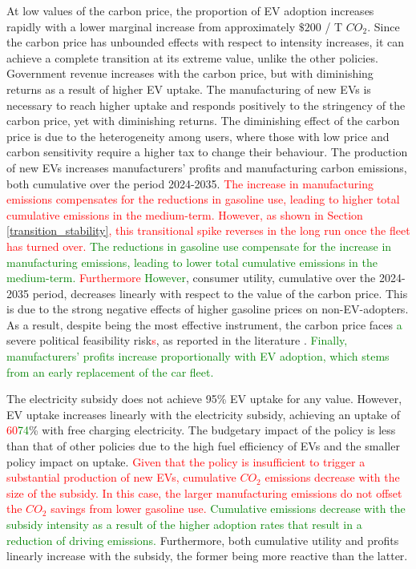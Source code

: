 \documentclass[12pt]{article}
\begin{document}
	At low values of the carbon price, the proportion of EV adoption increases rapidly with a lower marginal increase from approximately $\$200$ / T $CO_2$. Since the carbon price has unbounded effects with respect to intensity increases, it can achieve a complete transition at its extreme value, unlike the other policies. Government revenue increases with the carbon price, but with diminishing returns as a result of higher EV uptake. The manufacturing of new EVs is necessary to reach higher uptake and responds positively to the stringency of the carbon price, yet with diminishing returns. The diminishing effect of the carbon price is due to the heterogeneity among users, where those with low price and carbon sensitivity require a higher tax to change their behaviour. The production of new EVs increases manufacturers' profits and manufacturing carbon emissions, both cumulative over the period 2024-2035. \textcolor{red}{The increase in manufacturing emissions compensates for the reductions in gasoline use, leading to higher total cumulative emissions in the medium-term. However, as shown in Section \ref{transition_stability}, this transitional spike reverses in the long run once the fleet has turned over.} \textcolor{green}{The reductions in gasoline use compensate for the increase in manufacturing emissions, leading to lower total cumulative emissions in the medium-term.} \textcolor{red}{Furthermore} \textcolor{green}{However}, consumer utility, cumulative over the 2024-2035 period, decreases linearly with respect to the value of the carbon price. This is due to the strong negative effects of higher gasoline prices on non-EV-adopters. As a result, despite being the most effective instrument, the carbon price faces \textcolor{green}{a} severe political feasibility risk\textcolor{red}{s}, as reported in the literature \citep{maestre-andres_perceived_2019,savin2024carbon,mayol_analysis_2025}. \textcolor{green}{Finally, manufacturers' profits increase proportionally with EV adoption, which stems from an early replacement of the car fleet.}
	
	The electricity subsidy does not achieve 95\% EV uptake for any value. However, EV uptake increases linearly with the electricity subsidy, achieving an uptake of \textcolor{red}{60}\textcolor{green}{74}\% with free charging electricity. The budgetary impact of the policy is less than that of other policies due to the high fuel efficiency of EVs and the smaller policy impact on uptake. \textcolor{red}{Given that the policy is insufficient to trigger a substantial production of new EVs, cumulative $CO_2$ emissions decrease with the size of the subsidy. In this case, the larger manufacturing emissions do not offset the $CO_2$ savings from lower gasoline use.} \textcolor{green}{Cumulative emissions decrease with the subsidy intensity as a result of the higher adoption rates that result in a reduction of driving emissions.} Furthermore, both cumulative utility and profits linearly increase with the subsidy, the former being more reactive than the latter. 
	
\end{document}
